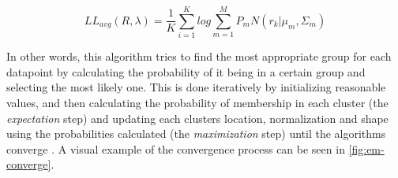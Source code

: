 \documentclass
[
    a4paper,
    twoside,
    12pt,
]
{report}
\begin{document}
\begin{equation}
\label{eq:max-log-like}
LL_{avg}(R,\lambda) =\frac{1}{K}\sum_{i=1}^Klog\sum_{m=1}^{M}P_mN(r_k|\mu_m,\Sigma_m)
\end{equation}

In other words, this algorithm tries to find the most appropriate group
for each datapoint by calculating the probability of it being in a
certain group and selecting the most likely one. This is done
iteratively by initializing reasonable values, and then calculating the
probability of membership in each cluster (the \emph{expectation} step)
and updating each clusters location, normalization and shape using the
probabilities calculated (the \emph{maximization} step) until the
algorithms converge \parencite{vanderplas2016}. A visual example of the
convergence process can be seen in \autoref{fig:em-converge}.
\end{document}
